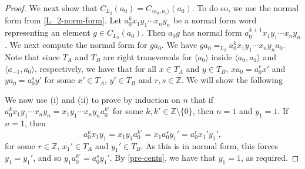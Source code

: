 \documentclass[11pt]{amsart}
\theoremstyle{definition}
\numberwithin{theorem}{section}
\newcommand{\Z}{\mathbb{Z}}
\begin{document}
\begin{proof}
	We next show that \(C_{L_2}(a_0) = C_{\langle a_0, a_1 \rangle}(a_0)\). To
	do so, we use the normal form from \cref{L_2-norm-form}.  Let \(a_0^k x_1
	y_1 \cdots x_n y_n\) be a normal form word representing an element \(g \in
	C_{L_2}(a_0)\). Then \(a_0 g\) has normal form \(a_0^{k + 1} x_1 y_1 \cdots
	x_n y_n\). We next compute the normal form for \(g a_0\). We have \(g a_0
	=_{L_2} a_0^k x_1 y_1 \cdots x_n y_n a_0\). Note that since
	\(T_A\) and \(T_B\) are right transversals for \(\langle a_0\rangle\)
	inside \(\langle a_0, a_1 \rangle\) and \(\langle a_{-1}, a_0 \rangle\),
	respectively, we have that for all \(x \in T_A\) and \(y \in T_B\),
	\(x a_0 = a_0^r x'\) and \(y a_0 = a_0^s y'\) for some \(x' \in T_A\),
	\(y' \in T_B\) and \(r, s \in \Z\). We will show the following
	
	We now use (i) and (ii) to prove by induction on \(n\) that if \(a_0^k x_1
	y_1 \cdots x_n y_n = x_1 y_1 \cdots x_n y_n a_0^{k'}\) for some \(k, k' \in
	\Z \setminus \{0\}\), then \(n = 1\) and \(y_1 = 1\). If \(n = 1\), then
	\[
			a_0^{k} x_1 y_1 = x_1 y_1 a_0^{k'} = x_1 a_0^s y_1' =
		a_0^{r} x_1' y_1',
	\]
	for some \(r \in \Z\), \(x_1' \in T_A\) and \(y_1' \in T_B\). As this is in
	normal form, this forces \(y_1 = y_1'\), and so \(y_1 a_0^{k'} = a_0^s
	y_1'\). 
	By \cref{pre-cents}, we have that \(y_1 = 1\), as required.


\end{proof}
\end{document}
